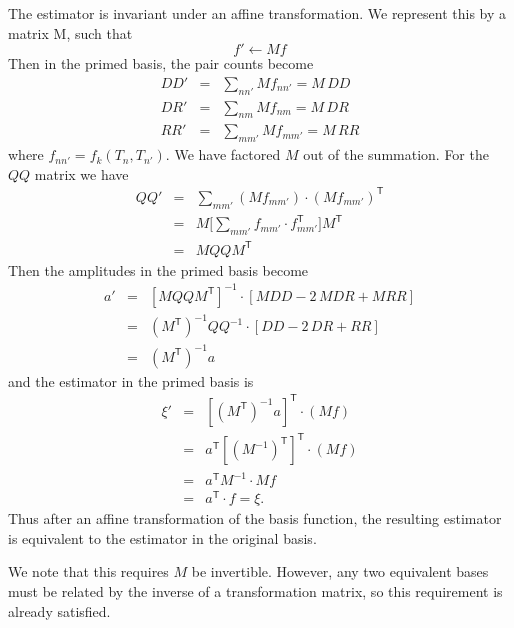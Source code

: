 \documentclass[modern]{aastex62}
\newcommand{\inv}{^{-1}}
\newcommand{\T}{^{\mathsf{T}}}
\begin{document}
The estimator is invariant under an affine transformation. We represent this by a matrix M, such that 
\begin{equation}
f' \leftarrow Mf
\end{equation}
Then in the primed basis, the pair counts become
\begin{eqnarray}\displaystyle
DD' &=& \sum_{n n'} M f_{n n'} = M\,DD
\\
DR' &=& \sum_{n m} M f_{n m} = M\,DR
\\
RR' &=& \sum_{m m'} M f_{m m'} = M\,RR
\end{eqnarray}
where $f_{n n'} = f_k(T_n, T_{n'})$.
We have factored $M$ out of the summation. For the $QQ$ matrix we have
\begin{eqnarray}\displaystyle
QQ' &=& \sum_{m m'} (Mf_{m m'}) \cdot (Mf_{m m'})\T \\
&=& M\Bigg[ \sum_{m m'} f_{m m'} \cdot f_{m m'}\T \Bigg]M\T \\
&=& M QQ M\T
\end{eqnarray}
Then the amplitudes in the primed basis become
\begin{eqnarray}\displaystyle
a' &=& [M QQ M\T]\inv \cdot [MDD - 2\,MDR + MRR] \\
&=& (M\T)\inv QQ\inv \cdot [DD - 2\,DR + RR] \\
&=& (M\T)\inv a
\end{eqnarray}
and the estimator in the primed basis is 
\begin{eqnarray}\displaystyle
\xi' &=& [(M\T)\inv a]\T \cdot (Mf) \\
&=& a\T[(M\inv)\T]\T \cdot (Mf) \\
&=& a\T M\inv \cdot Mf \\
&=& a\T \cdot f = \xi.
\end{eqnarray}
Thus after an affine transformation of the basis function, the resulting estimator is equivalent to the estimator in the original basis.

We note that this requires $M$ be invertible.
However, any two equivalent bases must be related by the inverse of a transformation matrix, so this requirement is already satisfied.

% 

\end{document}
